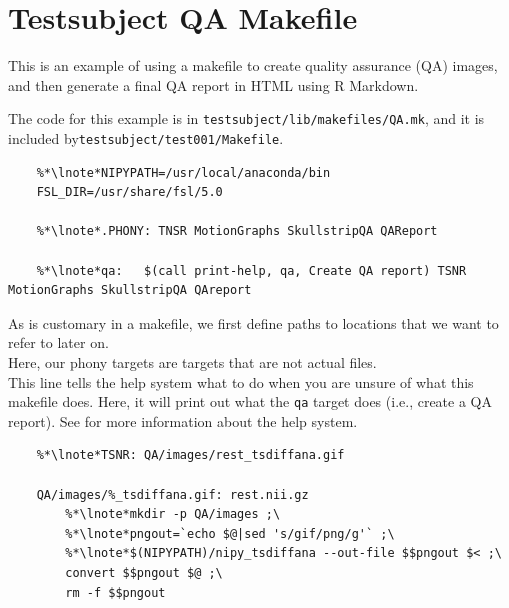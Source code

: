 \section{Testsubject QA Makefile}
\label{example:testsubjectQA}

This is an example of using a makefile to create quality assurance (QA) images, and then generate a final QA report in HTML using R Markdown. 

The code for this example is in \texttt{testsubject/lib/makefiles/QA.mk}, and it is included by\linebreak \texttt{testsubject/test001/Makefile}.

\setcounter{codehighlight}{0} %
\begin{lstlisting}
	%*\lnote*NIPYPATH=/usr/local/anaconda/bin
	FSL_DIR=/usr/share/fsl/5.0

	%*\lnote*.PHONY: TNSR MotionGraphs SkullstripQA QAReport

	%*\lnote*qa:   $(call print-help, qa, Create QA report) TSNR MotionGraphs SkullstripQA QAreport
\end{lstlisting}

\noindent{} As is customary in a makefile, we first define paths
to locations that we want to refer to later on. \\
 Here, our phony targets are targets that are not actual files.\\
 This line tells the \maken{} help system what to do when you
are unsure of what this makefile does. Here, it will print out what
the \texttt{qa} target does (i.e., create a QA report). See  for more information about the help system. \\

\begin{lstlisting}
	%*\lnote*TSNR: QA/images/rest_tsdiffana.gif

	QA/images/%_tsdiffana.gif: rest.nii.gz
		%*\lnote*mkdir -p QA/images ;\
		%*\lnote*pngout=`echo $@|sed 's/gif/png/g'` ;\
		%*\lnote*$(NIPYPATH)/nipy_tsdiffana --out-file $$pngout $< ;\
		convert $$pngout $@ ;\
		rm -f $$pngout
\end{lstlisting}

